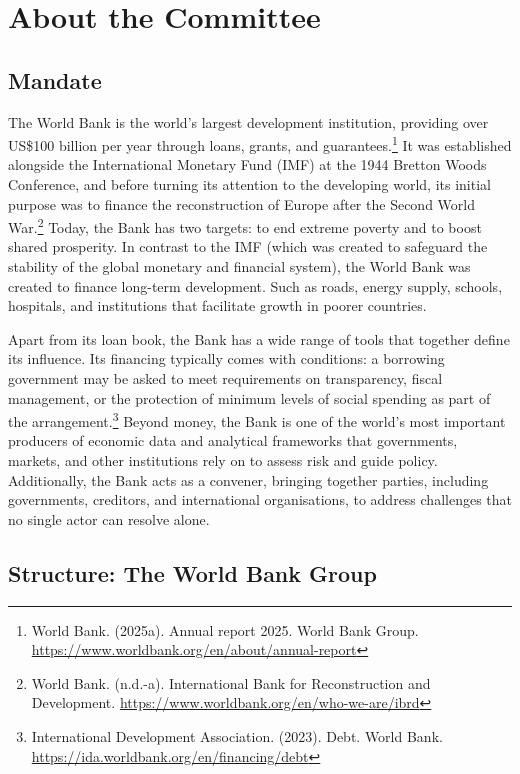 \section{About the Committee}

\subsection{Mandate}

The World Bank is the world’s largest development institution, providing over US\$100 billion per year through loans, grants, and guarantees.\footnote{World Bank. (2025a). Annual report 2025. World Bank Group. \url{https://www.worldbank.org/en/about/annual-report}} It was established alongside the International Monetary Fund (IMF) at the 1944 Bretton Woods Conference, and before turning its attention to the developing world, its initial purpose was to finance the reconstruction of Europe after the Second World War.\footnote{World Bank. (n.d.-a). International Bank for Reconstruction and Development. \url{https://www.worldbank.org/en/who-we-are/ibrd}} Today, the Bank has two targets: to end extreme poverty and to boost shared prosperity. In contrast to the IMF (which was created to safeguard the stability of the global monetary and financial system), the World Bank was created to finance long-term development. Such as roads, energy supply, schools, hospitals, and institutions that facilitate growth in poorer countries.

Apart from its loan book, the Bank has a wide range of tools that together define its influence. Its financing typically comes with conditions: a borrowing government may be asked to meet requirements on transparency, fiscal management, or the protection of minimum levels of social spending as part of the arrangement.\footnote{International Development Association. (2023). Debt. World Bank. \url{https://ida.worldbank.org/en/financing/debt}} Beyond money, the Bank is one of the world’s most important producers of economic data and analytical frameworks that governments, markets, and other institutions rely on to assess risk and guide policy. Additionally, the Bank acts as a convener, bringing together parties, including governments, creditors, and international organisations, to address challenges that no single actor can resolve alone.

\subsection{Structure: The World Bank Group}

